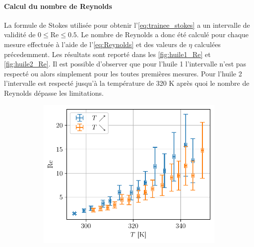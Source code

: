 \paragraph{Calcul du nombre de Reynolds}
La formule de Stokes utilisée pour obtenir l'\autoref{eq:trainee_stokes} a un intervalle de validité de $0 \leq \mathrm{Re} \leq 0.5$. Le nombre de Reynolds a donc été calculé pour chaque mesure effectuée à l'aide de l'\autoref{eq:Reynolds} et des valeurs de $\eta$ calculées précedemment. Les résultats sont reporté dans les \autoref{fig:huile1_Re} et \autoref{fig:huile2_Re}. Il est possible d'observer que pour l'huile 1 l'intervalle n'est pas respecté ou alors simplement pour les toutes premières mesures. Pour l'huile 2 l'intervalle est respecté jusqu'à la température de 320 \si{\kelvin} après quoi le nombre de Reynolds dépasse les limitations.
\begin{figure}[H]
    \centering
    \begin{subfigure}{0.48\linewidth}
        \centering
        \includegraphics[width=\linewidth]{figures/huile1_Re.pdf}
        \caption{}
        \label{fig:huile1_Re}
    \end{subfigure}
    \begin{subfigure}{0.48\linewidth}
        \centering

\end{subfigure}
\end{figure}

